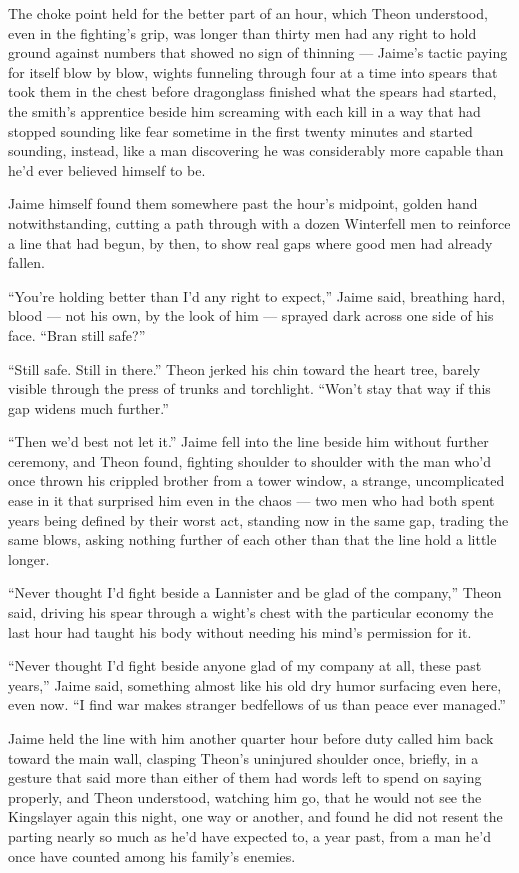 The choke point held for the better part of an hour, which Theon understood, even in the fighting’s grip, was longer than thirty men had any right to hold ground against numbers that showed no sign of thinning — Jaime’s tactic paying for itself blow by blow, wights funneling through four at a time into spears that took them in the chest before dragonglass finished what the spears had started, the smith’s apprentice beside him screaming with each kill in a way that had stopped sounding like fear sometime in the first twenty minutes and started sounding, instead, like a man discovering he was considerably more capable than he’d ever believed himself to be.

Jaime himself found them somewhere past the hour’s midpoint, golden hand notwithstanding, cutting a path through with a dozen Winterfell men to reinforce a line that had begun, by then, to show real gaps where good men had already fallen.

“You’re holding better than I’d any right to expect,” Jaime said, breathing hard, blood — not his own, by the look of him — sprayed dark across one side of his face. “Bran still safe?”

“Still safe. Still in there.” Theon jerked his chin toward the heart tree, barely visible through the press of trunks and torchlight. “Won’t stay that way if this gap widens much further.”

“Then we’d best not let it.” Jaime fell into the line beside him without further ceremony, and Theon found, fighting shoulder to shoulder with the man who’d once thrown his crippled brother from a tower window, a strange, uncomplicated ease in it that surprised him even in the chaos — two men who had both spent years being defined by their worst act, standing now in the same gap, trading the same blows, asking nothing further of each other than that the line hold a little longer.

“Never thought I’d fight beside a Lannister and be glad of the company,” Theon said, driving his spear through a wight’s chest with the particular economy the last hour had taught his body without needing his mind’s permission for it.

“Never thought I’d fight beside anyone glad of my company at all, these past years,” Jaime said, something almost like his old dry humor surfacing even here, even now. “I find war makes stranger bedfellows of us than peace ever managed.”

Jaime held the line with him another quarter hour before duty called him back toward the main wall, clasping Theon’s uninjured shoulder once, briefly, in a gesture that said more than either of them had words left to spend on saying properly, and Theon understood, watching him go, that he would not see the Kingslayer again this night, one way or another, and found he did not resent the parting nearly so much as he’d have expected to, a year past, from a man he’d once have counted among his family’s enemies.


